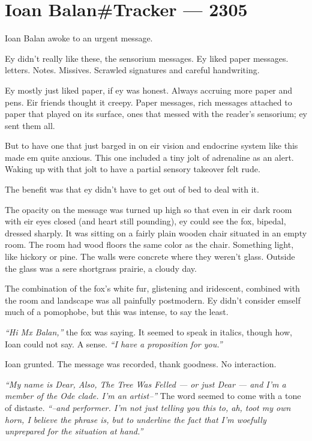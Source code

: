 \chapter*{Ioan Balan\#Tracker — 2305}

Ioan Balan awoke to an urgent message.

Ey didn't really like these, the sensorium messages. Ey liked paper messages. letters. Notes. Missives. Scrawled signatures and careful handwriting.

Ey mostly just liked paper, if ey was honest. Always accruing more paper and pens. Eir friends thought it creepy. Paper messages, rich messages attached to paper that played on its surface, ones that messed with the reader's sensorium; ey sent them all.

But to have one that just barged in on eir vision and endocrine system like this made em quite anxious. This one included a tiny jolt of adrenaline as an alert. Waking up with that jolt to have a partial sensory takeover felt rude.

The benefit was that ey didn't have to get out of bed to deal with it.

The opacity on the message was turned up high so that even in eir dark room with eir eyes closed (and heart still pounding), ey could see the fox, bipedal, dressed sharply. It was sitting on a fairly plain wooden chair situated in an empty room. The room had wood floors the same color as the chair. Something light, like hickory or pine. The walls were concrete where they weren't glass. Outside the glass was a sere shortgrass prairie, a cloudy day.

The combination of the fox's white fur, glistening and iridescent, combined with the room and landscape was all painfully postmodern. Ey didn't consider emself much of a pomophobe, but this was intense, to say the least.

\emph{``Hi Mx Balan,''} the fox was saying. It seemed to speak in italics, though how, Ioan could not say. A sense. \emph{``I have a proposition for you.''}

Ioan grunted. The message was recorded, thank goodness. No interaction.

\emph{``My name is Dear, Also, The Tree Was Felled --- or just Dear --- and I'm a member of the Ode clade. I'm an artist--''} The word seemed to come with a tone of distaste. \emph{``--and performer. I'm not just telling you this to, ah, toot my own horn, I believe the phrase is, but to underline the fact that I'm woefully unprepared for the situation at hand.''}

